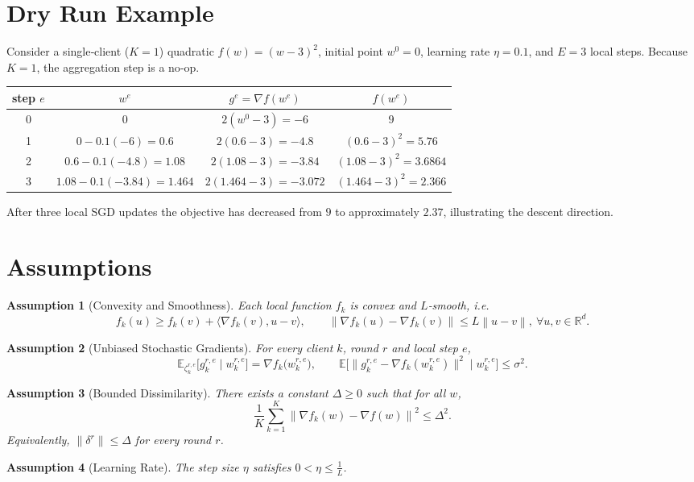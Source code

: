 \documentclass{article}
\newtheorem{assumption}{Assumption}
\newcommand{\E}{\mathbb{E}}
\newcommand{\norm}[1]{\left\lVert#1\right\rVert}
\newcommand{\inner}[2]{\langle #1,#2\rangle}
\newcommand{\grad}{\nabla}
\begin{document}
\section*{Dry Run Example}
Consider a single‑client ($K=1$) quadratic $f(w)=(w-3)^{2}$,
initial point $w^{0}=0$, learning rate $\eta=0.1$, and $E=3$ local steps.
Because $K=1$, the aggregation step is a no‑op.

\begin{center}
\begin{tabular}{c|c|c|c}
step $e$ & $w^{e}$ & $g^{e}=\grad f(w^{e})$ & $f(w^{e})$\\\hline
0 & $0$ & $2(w^{0}-3)=-6$ & $9$\\
1 & $0-0.1(-6)=0.6$ & $2(0.6-3)=-4.8$ & $(0.6-3)^{2}=5.76$\\
2 & $0.6-0.1(-4.8)=1.08$ & $2(1.08-3)=-3.84$ & $(1.08-3)^{2}=3.6864$\\
3 & $1.08-0.1(-3.84)=1.464$ & $2(1.464-3)=-3.072$ & $(1.464-3)^{2}=2.366$\\
\end{tabular}
\end{center}
After three local SGD updates the objective has decreased from $9$ to
approximately $2.37$, illustrating the descent direction.

\newpage
\section*{Assumptions}
\begin{assumption}[Convexity and Smoothness]\label{as:convex}
Each local function $f_k$ is convex and $L$‑smooth, i.e.
\[
f_k(u)\ge f_k(v)+\inner{\grad f_k(v)}{u-v},
\qquad
\norm{\grad f_k(u)-\grad f_k(v)}\le L\norm{u-v},
\ \forall u,v\in\mathbb R^{d}.
\]
\end{assumption}
\begin{assumption}[Unbiased Stochastic Gradients]\label{as:unbiased}
For every client $k$, round $r$ and local step $e$,
\[
\E_{\zeta_{k}^{r,e}}\!\big[g_{k}^{r,e}\mid w_{k}^{r,e}\big]=\grad f_k\!\big(w_{k}^{r,e}\big),
\qquad
\E\!\big[\|g_{k}^{r,e}-\grad f_k(w_{k}^{r,e})\|^{2}\mid w_{k}^{r,e}\big]\le\sigma^{2}.
\]
\end{assumption}
\begin{assumption}[Bounded Dissimilarity]\label{as:drift}
There exists a constant $\Delta\ge0$ such that for all $w$,
\[
\frac1K\sum_{k=1}^{K}\norm{\grad f_k(w)-\grad f(w)}^{2}\le\Delta^{2}.
\]
Equivalently, $\|\delta^{r}\|\le\Delta$ for every round $r$.
\end{assumption}
\begin{assumption}[Learning Rate]\label{as:lr}
The step size $\eta$ satisfies $0<\eta\le \frac{1}{L}$.
\end{assumption}
\end{document}
